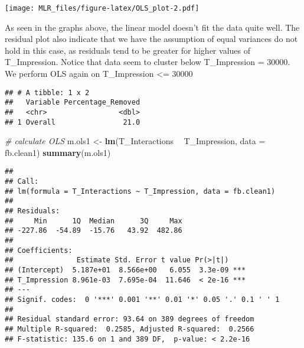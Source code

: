 \documentclass[
]{article}
\newenvironment{Shaded}{\begin{snugshade}}{\end{snugshade}}
\newcommand{\CommentTok}[1]{\textcolor[rgb]{0.56,0.35,0.01}{\textit{#1}}}
\newcommand{\DataTypeTok}[1]{\textcolor[rgb]{0.13,0.29,0.53}{#1}}
\newcommand{\DecValTok}[1]{\textcolor[rgb]{0.00,0.00,0.81}{#1}}
\newcommand{\KeywordTok}[1]{\textcolor[rgb]{0.13,0.29,0.53}{\textbf{#1}}}
\newcommand{\NormalTok}[1]{#1}
\newcommand{\OperatorTok}[1]{\textcolor[rgb]{0.81,0.36,0.00}{\textbf{#1}}}
\newcommand{\StringTok}[1]{\textcolor[rgb]{0.31,0.60,0.02}{#1}}
\begin{document}
\texttt{[image: MLR\_files/figure-latex/OLS\_plot-2.pdf]}

As seen in the graphs above, the linear model doesn't fit the data quite
well. The residual plot also indicate that we have the assumption of
equal variances do not hold in this case, as residuals tend to be
greater for higher values of T\_Impression. Notice that data seem to
cluster below T\_Impression = 30000. We perform OLS again on
T\_Impression \textless= 30000

\begin{Shaded}
\end{Shaded}

\begin{verbatim}
## # A tibble: 1 x 2
##   Variable Percentage_Removed
##   <chr>                 <dbl>
## 1 Overall                21.0
\end{verbatim}

\begin{Shaded}
\begin{Highlighting}[]
\CommentTok{# calculate OLS}
\NormalTok{m.ols1 <-}\StringTok{ }\KeywordTok{lm}\NormalTok{(T_Interactions }\OperatorTok{~}\StringTok{ }\NormalTok{T_Impression, }\DataTypeTok{data =}\NormalTok{ fb.clean1)}
\KeywordTok{summary}\NormalTok{(m.ols1)}
\end{Highlighting}
\end{Shaded}

\begin{verbatim}
## 
## Call:
## lm(formula = T_Interactions ~ T_Impression, data = fb.clean1)
## 
## Residuals:
##     Min      1Q  Median      3Q     Max 
## -227.86  -54.89  -15.76   43.92  482.86 
## 
## Coefficients:
##               Estimate Std. Error t value Pr(>|t|)    
## (Intercept)  5.187e+01  8.566e+00   6.055  3.3e-09 ***
## T_Impression 8.961e-03  7.695e-04  11.646  < 2e-16 ***
## ---
## Signif. codes:  0 '***' 0.001 '**' 0.01 '*' 0.05 '.' 0.1 ' ' 1
## 
## Residual standard error: 93.64 on 389 degrees of freedom
## Multiple R-squared:  0.2585, Adjusted R-squared:  0.2566 
## F-statistic: 135.6 on 1 and 389 DF,  p-value: < 2.2e-16
\end{verbatim}
\end{document}
